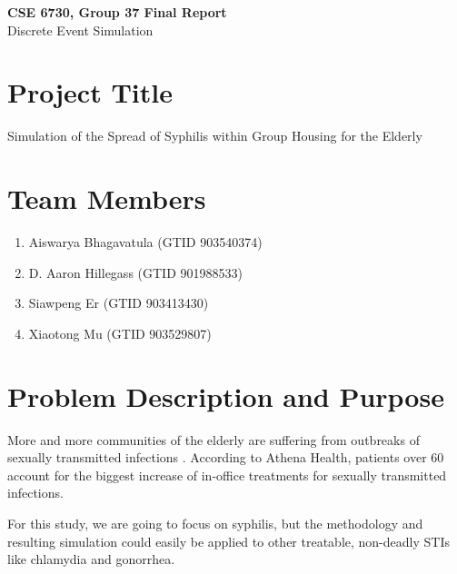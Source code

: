 \documentclass{article}
\begin{document}
	\begin{center}
    
		\LARGE{\textbf{CSE 6730, Group 37 Final Report}} \\
        \vspace{1em}
        \Large{Discrete Event Simulation} \\
     
	\end{center}
    \begin{normalsize}
    
    	\section{Project Title}
        
Simulation of the Spread of Syphilis within Group Housing for the Elderly
      
		\section{Team Members}
        
      \begin{enumerate}
      	\item Aiswarya Bhagavatula (GTID 903540374)
      	\item D. Aaron Hillegass (GTID 901988533)
      	\item Siawpeng Er (GTID 903413430)
      	\item Xiaotong Mu (GTID 903529807)
      \end{enumerate}
        
	   	\section{Problem Description and Purpose}
        
    More and more communities of the elderly are suffering from outbreaks of sexually transmitted infections \cite{mcdaniel_2017}. According to Athena Health, patients over 60 account for the biggest increase of in-office treatments for sexually transmitted infections.
    
    For this study, we are going to focus on syphilis, but the methodology and resulting simulation could easily be applied to other treatable, non-deadly STIs like chlamydia and gonorrhea.
    

\end{normalsize}
\end{document}
